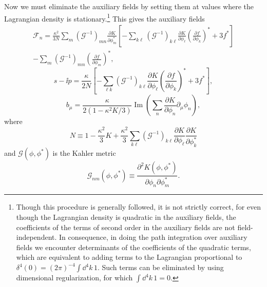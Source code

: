 Now we must eliminate the auxiliary fields by setting them at values
where the Lagrangian density is stationary.\footnote{Though this
procedure is generally followed, it is not strictly correct, for even
though the Lagrangian density is quadratic in the auxiliary fields, the
coefficients of the terms of second order in the auxiliary fields are
not field-independent. In consequence, in doing the path integration
over auxiliary fields we encounter determinants of the coefficients of
the quadratic terms, which are equivalent to adding terms to the
Lagrangian proportional to
\(\delta^4(0)=(2\pi)^{-4}\int \dd^4k\,1\). Such terms can be eliminated
by using dimensional regularization, for which \(\int \dd^4k\,1=0\).}
This gives the auxiliary fields
\begin{multline}
  \mathcal F_n
  =\frac{\kappa^2}{3N}\sum_m
    (\mathcal G^{-1})_{mn}
    \frac{\partial K}{\partial\phi_m^*}
    \left[
      -\sum_{k\ell}(\mathcal G^{-1})_{k\ell}
       \frac{\partial K}{\partial\phi_\ell}
       \left(\frac{\partial f}{\partial\phi_k}\right)^*
      +3f^*
    \right]\\
  -\sum_m(\mathcal G^{-1})_{mn}
    \left(\frac{\partial f}{\partial\phi_m}\right)^*,
  \tag{31.6.58}\label{eq:31.6.58}
\end{multline}
\begin{equation}
  s-\ii p
  =\frac{\kappa}{2N}\left[
    -\sum_{\ell k}(\mathcal G^{-1})_{k\ell}
      \frac{\partial K}{\partial\phi_\ell}
      \left(\frac{\partial f}{\partial\phi_k}\right)^*
    +3f^*
  \right],
  \tag{31.6.59}\label{eq:31.6.59}
\end{equation}
\begin{equation}
  b_\mu
  =\frac{\kappa}{2(1-\kappa^2K/3)}
    \operatorname{Im}\left(
      \sum_n\frac{\partial K}{\partial\phi_n}\partial_\mu\phi_n
    \right),
  \tag{31.6.60}\label{eq:31.6.60}
\end{equation}
where
\[
  N\equiv
  1-\frac{\kappa^2}{3}K
  +\frac{\kappa^2}{3}\sum_{k\ell}
    (\mathcal G^{-1})_{k\ell}
    \frac{\partial K}{\partial\phi_\ell}
    \frac{\partial K}{\partial\phi_k^*}
\]
and \(\mathcal G(\phi,\phi^*)\) is the Kahler metric
\begin{equation}
  \mathcal G_{nm}(\phi,\phi^*)
  \equiv
  \frac{\partial^2K(\phi,\phi^*)}
       {\partial\phi_n\partial\phi_m^*}.
  \tag{31.6.61}\label{eq:31.6.61}
\end{equation}


